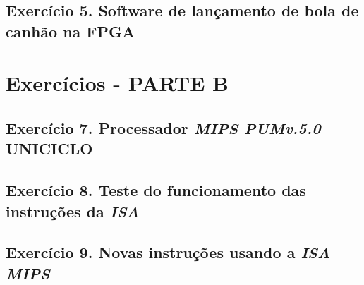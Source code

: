 \documentclass[12pt]{article}
\begin{document}
\subsection{Exercício 5. Software de lançamento de bola de canhão na FPGA}
\label{subsec:canhao}

\section{Exercícios - PARTE B}
\label{sec:exerciciosB}

\subsection{Exercício 7. Processador \textit{MIPS PUMv.5.0} UNICICLO}
\label{subsec:mips_uniciclo}


\subsection{Exercício 8. Teste do funcionamento das instruções da \textit{ISA}}
\label{subsec:testeisa}
 
\subsection{Exercício 9. Novas instruções usando a \textit{ISA MIPS}}
\label{subsec:newint}



\end{document}
